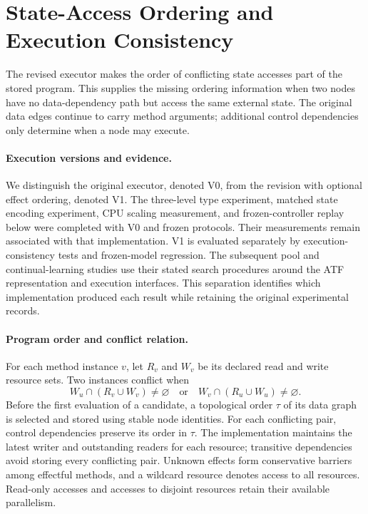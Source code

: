 \section{State-Access Ordering and Execution Consistency}
\label{app:revision_effects}

The revised executor makes the order of conflicting state accesses part of the
stored program. This supplies the missing ordering information when two nodes
have no data-dependency path but access the same external state. The original
data edges continue to carry method arguments; additional control dependencies
only determine when a node may execute.

\paragraph{Execution versions and evidence.}
We distinguish the original executor, denoted V0, from the revision with optional
effect ordering, denoted V1. The three-level type experiment, matched state
encoding experiment, CPU scaling measurement, and frozen-controller replay below
were completed with V0 and frozen protocols. Their measurements remain associated
with that implementation. V1 is evaluated separately by execution-consistency
tests and frozen-model regression. The subsequent pool and continual-learning
studies use their stated search procedures around the ATF representation and
execution interfaces. This separation identifies which implementation produced
each result while retaining the original experimental records.

\paragraph{Program order and conflict relation.}
For each method instance $v$, let $R_v$ and $W_v$ be its declared read and write
resource sets. Two instances conflict when
\begin{equation}
 W_u\cap(R_v\cup W_v)\ne\varnothing
 \quad\text{or}\quad
 W_v\cap(R_u\cup W_u)\ne\varnothing .
\label{eq:revision_conflict}
\end{equation}
Before the first evaluation of a candidate, a topological order $\tau$ of its
data graph is selected and stored using stable node identities. For each
conflicting pair, control dependencies preserve its order in $\tau$.
The implementation maintains the latest writer and outstanding readers for
each resource; transitive dependencies avoid storing every conflicting pair.
Unknown effects form conservative barriers among effectful methods, and a
wildcard resource denotes access to all resources. Read-only accesses and
accesses to disjoint resources retain their available parallelism.

